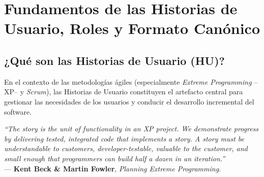 
\chapter{Fundamentos de las Historias de Usuario, Roles y Formato Canónico}


\section{¿Qué son las Historias de Usuario (HU)?}

En el contexto de las metodologías ágiles (especialmente \textit{Extreme Programming} --XP-- y \textit{Scrum}), las Historias de Usuario constituyen el artefacto central para gestionar las necesidades de los usuarios y conducir el desarrollo incremental del software.

\begin{definicion}
\textit{``The story is the unit of functionality in an XP project. We demonstrate progress by delivering tested, integrated code that implements a story. A story must be understandable to customers, developer-testable, valuable to the customer, and small enough that programmers can build half a dozen in an iteration.''}\\
--- \textbf{Kent Beck \& Martin Fowler}, \textit{Planning Extreme Programming}.
\end{definicion}

